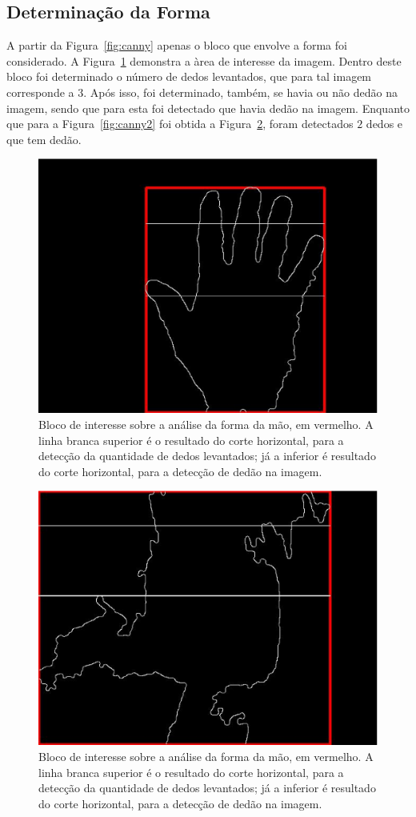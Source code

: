 \documentclass[conference]{Trabalho_Final}
\begin{document}
\subsection{Determina\c{c}\~ao da Forma}
  \label{subsec:deterforma1}
A partir da Figura~\ref{fig:canny} apenas o bloco que envolve a forma foi considerado. A Figura~\ref{fig:dedos} demonstra a \`area de interesse da imagem. Dentro deste bloco foi determinado o n\'umero de dedos levantados, que para tal imagem corresponde a $3$. Ap\'os isso, foi determinado, tamb\'em, se havia ou n\~ao ded\~ao na imagem, sendo que para esta foi detectado que havia ded\~ao na imagem. Enquanto que para a Figura~\ref{fig:canny2} foi obtida a Figura~\ref{fig:dedos2}, foram detectados $2$ dedos e que tem ded\~ao.

\begin{figure}[]
  \centering
  \includegraphics[width = 5 cm]{dedos}
  \caption{Bloco de interesse sobre a an\'alise da forma da m\~ao, em vermelho. A linha branca superior \'e o resultado do corte horizontal, para a detec\c{c}\~ao da quantidade de dedos levantados; j\'a a inferior \'e resultado do corte horizontal, para a detec\c{c}\~ao de ded\~ao na imagem.}
  \label{fig:dedos}
\end{figure}

\begin{figure}[]
  \centering
  \includegraphics[width = 5 cm]{dedos2}
  \caption{Bloco de interesse sobre a an\'alise da forma da m\~ao, em vermelho. A linha branca superior \'e o resultado do corte horizontal, para a detec\c{c}\~ao da quantidade de dedos levantados; j\'a a inferior \'e resultado do corte horizontal, para a detec\c{c}\~ao de ded\~ao na imagem.}
  \label{fig:dedos2}
\end{figure}
\end{document}
